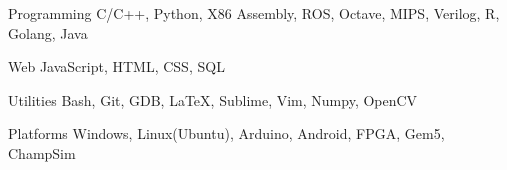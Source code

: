 \documentclass[12pt, a4paper]{awesome-cv}
\begin{document}

\begin{cvskills}


  \cvskill
  {Programming}
  {C/C++, Python, X86 Assembly, ROS, Octave, MIPS, Verilog, R, Golang, Java }


  \cvskill
  {Web}
  {JavaScript, HTML, CSS, SQL}


  \cvskill
  {Utilities}
  {Bash, Git, GDB, \LaTeX, Sublime, Vim, Numpy, OpenCV}
  
  \cvskill
  {Platforms}
  {Windows, Linux(Ubuntu), Arduino, Android, FPGA, Gem5, ChampSim}
\end{cvskills}
\end{document}

